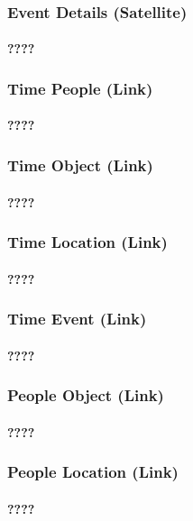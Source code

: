 \documentclass{acm_proc_article-sp}
\begin{document}
\subsubsection{Event Details (Satellite)}
\paragraph{????}
\subsubsection{Time People (Link)}
\paragraph{????}
\subsubsection{Time Object (Link)}
\paragraph{????}
\subsubsection{Time Location (Link)}
\paragraph{????}
\subsubsection{Time Event (Link)}
\paragraph{????}
\subsubsection{People Object (Link)}
\paragraph{????}
\subsubsection{People Location (Link)}
\paragraph{????}
\end{document}
